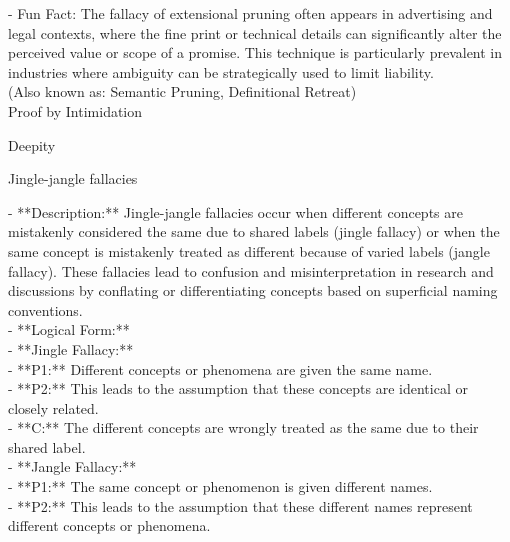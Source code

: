 \documentclass[a4paper,12pt,single,pdftex]{scrartcl}
\begin{document}
    
      - Fun Fact: The fallacy of extensional pruning often appears in advertising and legal contexts, where the fine print or technical details can significantly alter the perceived value or scope of a promise. This technique is particularly prevalent in industries where ambiguity can be strategically used to limit liability.
    \\

  
    
      (Also known as: Semantic Pruning, Definitional Retreat)
    \\

  

Proof by Intimidation

Deepity

Jingle-jangle fallacies
    
      - **Description:** Jingle-jangle fallacies occur when different concepts are mistakenly considered the same due to shared labels (jingle fallacy) or when the same concept is mistakenly treated as different because of varied labels (jangle fallacy). These fallacies lead to confusion and misinterpretation in research and discussions by conflating or differentiating concepts based on superficial naming conventions.
    \\

    
      - **Logical Form:**
    \\

    
        - **Jingle Fallacy:**
    \\

    
          - **P1:** Different concepts or phenomena are given the same name.
    \\

    
          - **P2:** This leads to the assumption that these concepts are identical or closely related.
    \\

    
          - **C:** The different concepts are wrongly treated as the same due to their shared label.
    \\

    
        - **Jangle Fallacy:**
    \\

    
          - **P1:** The same concept or phenomenon is given different names.
    \\

    
          - **P2:** This leads to the assumption that these different names represent different concepts or phenomena.
    \\
\end{document}
